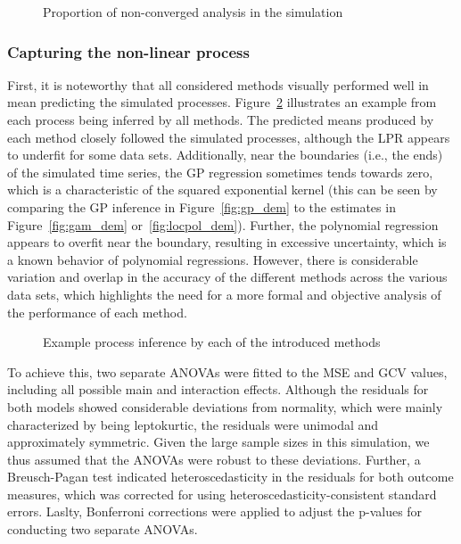 \documentclass[man, floatsintext]{apa7}
\begin{document}
\begin{figure}[!t]
  \caption{Proportion of non-converged analysis in the simulation}
  \label{fig:missing}
\end{figure}

\subsubsection{Capturing the non-linear process}

First, it is noteworthy that all considered methods visually performed well in
mean predicting the simulated processes. Figure~\ref{fig:smooth} illustrates an
example from each process being inferred by all methods. The predicted means
produced by each method closely followed the simulated processes, although the
LPR appears to underfit for some data sets. Additionally, near the boundaries
(i.e., the ends) of the simulated time series, the GP regression sometimes
tends towards zero, which is a characteristic of the squared exponential kernel
(this can be seen by comparing the GP inference in Figure~\ref{fig:gp_dem} to
the estimates in Figure~\ref{fig:gam_dem} or~\ref{fig:locpol_dem}). Further,
the polynomial regression appears to overfit near the boundary, resulting in
excessive uncertainty, which is a known behavior of polynomial regressions.
However, there is considerable variation and overlap in the accuracy of the
different methods across the various data sets, which highlights the need for a
more formal and objective analysis of the performance of each method.

\begin{figure}[!t]
  \caption{Example process inference by each of the introduced methods}
  \label{fig:smooth}
\end{figure}

To achieve this, two separate ANOVAs were fitted to the MSE and GCV values,
including all possible main and interaction effects. Although the residuals for
both models showed considerable deviations from normality, which were mainly
characterized by being leptokurtic, the residuals were unimodal and
approximately symmetric. Given the large sample sizes in this simulation, we
thus assumed that the ANOVAs were robust to these deviations. Further, a
Breusch-Pagan test indicated heteroscedasticity in the residuals for both
outcome measures, which was corrected for using heteroscedasticity-consistent
standard errors. Laslty, Bonferroni corrections were applied to adjust the
p-values for conducting two separate ANOVAs.
\end{document}
